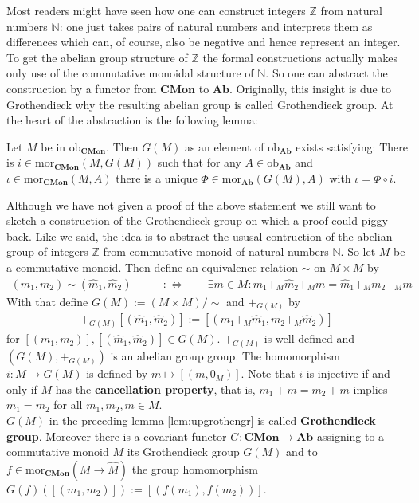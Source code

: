 \nocite{7fc005ba}
\nocite{a3f326d1}
Most readers might have seen how one can construct integers $\mathbb{Z}$ from natural numbers $\mathbb{N}$: one just takes pairs of natural numbers and interprets them as differences which can, of course, also be negative and hence represent an integer. To get the abelian group structure of $\mathbb{Z}$ the formal constructions actually makes only use of the commutative monoidal structure of $\mathbb{N}$. So one can abstract the construction by a functor from $\mathbf{CMon}$ to $\mathbf{Ab}$. Originally, this insight is due to Grothendieck why the resulting abelian group is called Grothendieck group. At the heart of the abstraction is the following lemma:
\\
\begin{lem}
\label{lem:upgrothengr}
Let $M$ be in $\mathrm{ob}_{\mathbf{CMon}}$. Then $G(M)$ as an element of $\mathrm{ob}_{\mathbf{Ab}}$ exists satisfying: There is $i \in \mathrm{mor}_{\mathbf{CMon}}(M,G(M))$ such that for any $A \in \mathrm{ob}_{\mathbf{Ab}}$ and $\iota \in \mathrm{mor}_{\mathbf{CMon}}(M,A)$ there is a unique $\Phi \in \mathrm{mor}_{\mathbf{Ab}}(G(M),A)$ with $\iota = \Phi \circ i$.
\end{lem}
Although we have not given a proof of the above statement we still want to sketch a construction of the Grothendieck group on which a proof could piggy-back. Like we said, the idea is to abstract the ususal contruction of the abelian group of integers $\mathbb{Z}$ from commutative monoid of natural numbers $\mathbb{N}$. So let $M$ be a commutative monoid. Then define an equivalence relation $\sim$ on $M \times M$ by
\begin{align*}
  (m_{1},m_{2})
  \sim
  (\hat{m}_{1},\hat{m}_{2})
  \qquad
  &:\Leftrightarrow
  \qquad
  \exists
  m
  \in
  M
  \colon
  m_{1}
  +_{M}
  \hat{m}_{2}
  +_{M}
  m
  =
  \hat{m}_{1}
  +_{M}
  m_{2}
  +_{M}
  m
\end{align*}
With that define $G(M) := (M \times M)/\sim$ and $+_{G(M)}$ by
\begin{align*}
  [(m_{1},m_{2})]
  +_{G(M)}
  [(\hat{m}_{1},\hat{m}_{2})]
  :=
  [(m_{1} +_{M} \hat{m}_{1},m_{2} +_{M} \hat{m}_{2})]
\end{align*}
for  $[(m_{1},m_{2})],[(\hat{m}_{1},\hat{m}_{2})] \in G(M)$. $+_{G(M)}$ is well-defined and $(G(M),+_{G(M)})$ is an abelian group group. The homomorphism $i \colon M \to G(M)$ is defined by $m \mapsto [(m,0_{M})]$. Note that $i$ is injective if and only if $M$ has the \textbf{cancellation property}, that is, $m_{1} + m = m_{2} + m$ implies $m_{1} = m_{2}$ for all $m_{1},m_{2},m \in M$.
\\
$G(M)$ in the preceding lemma \ref{lem:upgrothengr} is called \textbf{Grothendieck group}. Moreover there is a covariant functor $G \colon \mathbf{CMon} \to \mathbf{Ab}$ assigning to a commutative monoid $M$ its Grothendieck group $G(M)$ and to $f \in \mathrm{mor}_{\mathbf{CMon}}(M \to \hat{M})$ the group homomorphism $G(f)([(m_{1},m_{2})]) := [(f(m_{1}),f(m_{2}))]$.

